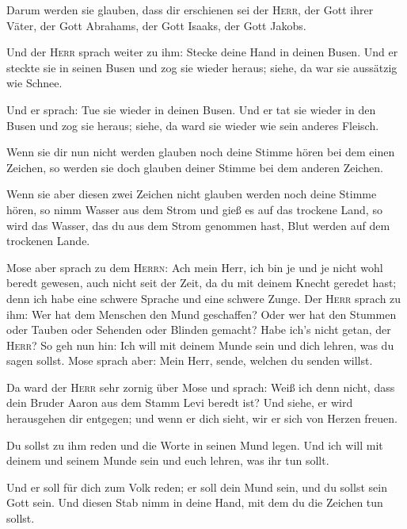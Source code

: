  Darum werden sie glauben, dass dir erschienen sei der
\textsc{Herr}, der Gott ihrer Väter, der Gott Abrahams, der Gott Isaaks,
der Gott Jakobs.

 Und der \textsc{Herr} sprach weiter zu ihm: Stecke deine
Hand in deinen Busen. Und er steckte sie in seinen Busen und zog sie
wieder heraus; siehe, da war sie aussätzig wie Schnee.

 Und er sprach: Tue sie wieder in deinen Busen. Und er tat
sie wieder in den Busen und zog sie heraus; siehe, da ward sie wieder
wie sein anderes Fleisch.

 Wenn sie dir nun nicht werden glauben noch deine Stimme
hören bei dem einen Zeichen, so werden sie doch glauben deiner Stimme
bei dem anderen Zeichen.

 Wenn sie aber diesen zwei Zeichen nicht glauben werden
noch deine Stimme hören, so nimm Wasser aus dem Strom und gieß es auf
das trockene Land, so wird das Wasser, das du aus dem Strom genommen
hast, Blut werden auf dem trockenen Lande.

 Mose aber sprach zu dem \textsc{Herrn}: Ach mein Herr,
ich bin je und je nicht wohl beredt gewesen, auch nicht seit der Zeit,
da du mit deinem Knecht geredet hast; denn ich habe eine schwere Sprache
und eine schwere Zunge.  Der \textsc{Herr} sprach zu ihm:
Wer hat dem Menschen den Mund geschaffen? Oder wer hat den Stummen oder
Tauben oder Sehenden oder Blinden gemacht? Habe ich's nicht getan, der
\textsc{Herr}?  So geh nun hin: Ich will mit deinem Munde
sein und dich lehren, was du sagen sollst.  Mose sprach
aber: Mein Herr, sende, welchen du senden willst.

 Da ward der \textsc{Herr} sehr zornig über Mose und
sprach: Weiß ich denn nicht, dass dein Bruder Aaron aus dem Stamm Levi
beredt ist? Und siehe, er wird herausgehen dir entgegen; und wenn er
dich sieht, wir er sich von Herzen freuen.

 Du sollst zu ihm reden und die Worte in seinen Mund
legen. Und ich will mit deinem und seinem Munde sein und euch lehren,
was ihr tun sollt.

 Und er soll für dich zum Volk reden; er soll dein Mund
sein, und du sollst sein Gott sein.  Und diesen Stab nimm
in deine Hand, mit dem du die Zeichen tun sollst.

